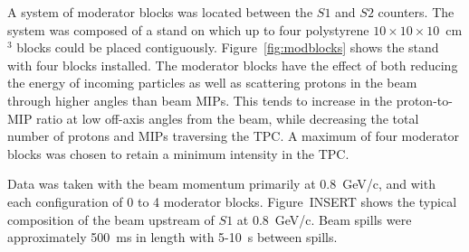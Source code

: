 A system of moderator blocks was located between the $\mathit{S1}$ and $\mathit{S2}$ counters.
The system was composed of a stand on which up to four polystyrene $10\times10\times10$~cm$^3$ blocks could be placed contiguously.
Figure~\ref{fig:modblocks} shows the stand with four blocks installed.
The moderator blocks have the effect of both reducing the energy of incoming particles as well as scattering protons in the beam through higher angles than beam MIPs.
This tends to increase in the proton-to-MIP ratio at low off-axis angles from the beam, while decreasing the total number of protons and MIPs traversing the TPC.
A maximum of four moderator blocks was chosen to retain a minimum intensity in the TPC.

Data was taken with the beam momentum primarily at 0.8~GeV/c, and with each configuration of 0 to 4 moderator blocks.
Figure~INSERT shows the typical composition of the beam upstream of $\mathit{S1}$ at 0.8~GeV/c. Beam spills were approximately 500~ms in length with 5-10~s between spills.  



